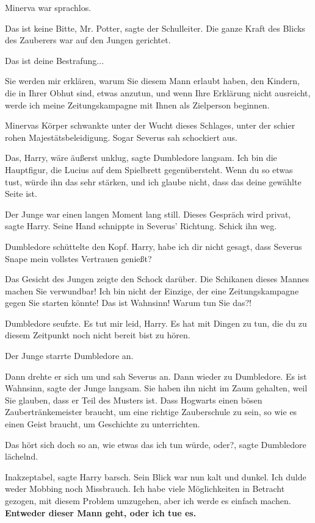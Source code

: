 Minerva war sprachlos.

\glqq Das ist keine Bitte, Mr. Potter\grqq{}, sagte der Schulleiter. Die ganze
Kraft des Blicks des Zauberers war auf den Jungen gerichtet.

\glqq Das ist deine Bestrafung...\grqq{}

\glqq Sie werden mir erklären, warum Sie diesem Mann erlaubt haben, den Kindern,
die in Ihrer Obhut sind, etwas anzutun, und wenn Ihre Erklärung nicht ausreicht,
werde ich meine Zeitungskampagne mit Ihnen als Zielperson beginnen.\grqq{}

Minervas Körper schwankte unter der Wucht dieses Schlages, unter der schier
rohen Majestätsbeleidigung. Sogar Severus sah schockiert aus.

\glqq Das, Harry, wäre äußerst unklug\grqq{}, sagte Dumbledore langsam. \glqq
Ich bin die Hauptfigur, die Lucius auf dem Spielbrett gegenübersteht. Wenn du so
etwas tust, würde ihn das sehr stärken, und ich glaube nicht, dass das deine
gewählte Seite ist.\grqq{}

Der Junge war einen langen Moment lang still. \glqq Dieses Gespräch wird
privat\grqq{}, sagte Harry. Seine Hand schnippte in Severus' Richtung. \glqq
Schick ihn weg.\grqq{}

Dumbledore schüttelte den Kopf. \glqq Harry, habe ich dir nicht gesagt, dass
Severus Snape mein vollstes Vertrauen genießt?\grqq{}

Das Gesicht des Jungen zeigte den Schock darüber. \glqq Die Schikanen dieses
Mannes machen Sie verwundbar! Ich bin nicht der Einzige, der eine
Zeitungskampagne gegen Sie starten könnte! Das ist Wahnsinn! Warum tun Sie
das?!\grqq{}

Dumbledore seufzte. \glqq Es tut mir leid, Harry. Es hat mit Dingen zu tun, die
du zu diesem Zeitpunkt noch nicht bereit bist zu hören.\grqq{}

Der Junge starrte Dumbledore an.

Dann drehte er sich um und sah Severus an. Dann wieder zu Dumbledore. \glqq Es
ist Wahnsinn\grqq{}, sagte der Junge langsam. \glqq Sie haben ihn nicht im Zaum
gehalten, weil Sie glauben, dass er Teil des Musters ist. Dass Hogwarts einen
bösen Zaubertränkemeister braucht, um eine richtige Zauberschule zu sein, so wie
es einen Geist braucht, um Geschichte zu unterrichten.\grqq{}

\glqq Das hört sich doch so an, wie etwas das ich tun würde, oder?\grqq{}, sagte
Dumbledore lächelnd.

\glqq Inakzeptabel\grqq{}, sagte Harry barsch. Sein Blick war nun kalt und
dunkel. \glqq Ich dulde weder Mobbing noch Missbrauch. Ich habe viele
Möglichkeiten in Betracht gezogen, mit diesem Problem umzugehen, aber ich werde
es einfach machen. \textbf{Entweder dieser Mann geht, oder ich tue es.}\grqq{}


